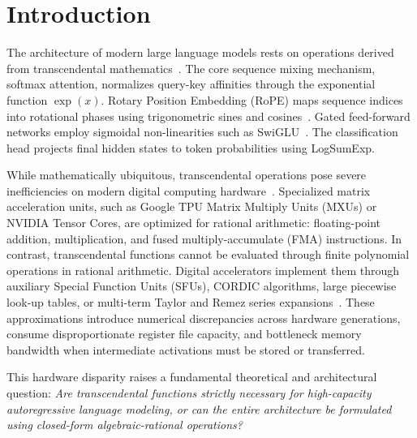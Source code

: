\documentclass[11pt,a4paper]{article}
\theoremstyle{definition}
\begin{document}
\section{Introduction}
\label{sec:intro}

The architecture of modern large language models rests on operations derived from transcendental mathematics~\citep{vaswani2017attention,touvron2023llama}. The core sequence mixing mechanism, softmax attention, normalizes query-key affinities through the exponential function $\exp(x)$. Rotary Position Embedding (RoPE) maps sequence indices into rotational phases using trigonometric sines and cosines~\citep{su2024roformer}. Gated feed-forward networks employ sigmoidal non-linearities such as SwiGLU~\citep{dauphin2017language,shazeer2020glu}. The classification head projects final hidden states to token probabilities using LogSumExp.

While mathematically ubiquitous, transcendental operations pose severe inefficiencies on modern digital computing hardware~\citep{jouppi2023tpu4}. Specialized matrix acceleration units, such as Google TPU Matrix Multiply Units (MXUs) or NVIDIA Tensor Cores, are optimized for rational arithmetic: floating-point addition, multiplication, and fused multiply-accumulate (FMA) instructions. In contrast, transcendental functions cannot be evaluated through finite polynomial operations in rational arithmetic. Digital accelerators implement them through auxiliary Special Function Units (SFUs), CORDIC algorithms, large piecewise look-up tables, or multi-term Taylor and Remez series expansions~\citep{dao2022flashattention}. These approximations introduce numerical discrepancies across hardware generations, consume disproportionate register file capacity, and bottleneck memory bandwidth when intermediate activations must be stored or transferred.

This hardware disparity raises a fundamental theoretical and architectural question: \emph{Are transcendental functions strictly necessary for high-capacity autoregressive language modeling, or can the entire architecture be formulated using closed-form algebraic-rational operations?}
\end{document}
